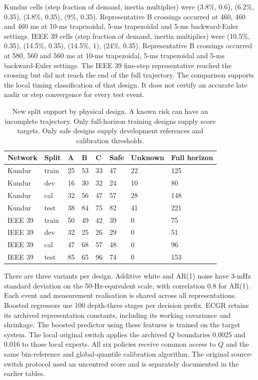 \documentclass[10pt]{article}
\begin{document}
Kundur cells (step fraction of demand, inertia multiplier) were (3.8\%, 0.6), (6.2\%, 0.35), (3.8\%, 0.35), (9\%, 0.35). Representative B crossings occurred at 460, 460 and 460 ms at 10-ms trapezoidal, 5-ms trapezoidal and 5-ms backward-Euler settings. IEEE 39 cells (step fraction of demand, inertia multiplier) were (10.5\%, 0.35), (14.5\%, 0.35), (14.5\%, 1), (24\%, 0.35). Representative B crossings occurred at 580, 560 and 560 ms at 10-ms trapezoidal, 5-ms trapezoidal and 5-ms backward-Euler settings. The IEEE 39 fine-step representative reached the crossing but did not reach the end of the full trajectory. The comparison supports the local timing classification of that design. It does not certify an accurate late nadir or step convergence for every test event.
\begin{table}[htbp]\centering\small
\caption{New split support by physical design. A known risk can have an incomplete trajectory. Only full-horizon training designs supply score targets. Only safe designs supply development references and calibration thresholds.}\label{tab:splitnew}
\begin{tabular}{@{}llllllll@{}}\toprule
Network & Split & A & B & C & Safe & Unknown & Full horizon \\\midrule
Kundur & train & 25 & 53 & 33 & 47 & 22 & 125 \\
Kundur & dev & 16 & 30 & 32 & 24 & 10 & 80 \\
Kundur & cal & 32 & 56 & 47 & 57 & 28 & 148 \\
Kundur & test & 38 & 84 & 75 & 82 & 41 & 221 \\
IEEE 39 & train & 50 & 49 & 42 & 39 & 0 & 75 \\
IEEE 39 & dev & 32 & 25 & 26 & 29 & 0 & 51 \\
IEEE 39 & cal & 47 & 68 & 57 & 48 & 0 & 96 \\
IEEE 39 & test & 85 & 65 & 96 & 74 & 0 & 153 \\
\bottomrule\end{tabular}\end{table}
There are three variants per design. Additive white and AR(1) noise have 3-mHz standard deviation on the 50-Hz-equivalent scale, with correlation 0.8 for AR(1). Each event and measurement realisation is shared across all representations. Boosted regressors use 100 depth-three stages per decision prefix. ECGR retains its archived representation constants, including its working covariance and shrinkage. The boosted predictor using these features is trained on the target system. The local original switch applies the archived $Q$ boundaries 0.0025 and 0.016 to those local experts. All six policies receive common access to $Q$ and the same bin-reference and global-quantile calibration algorithm. The original source-switch protocol used an uncentred score and is separately documented in the earlier tables.
\end{document}
